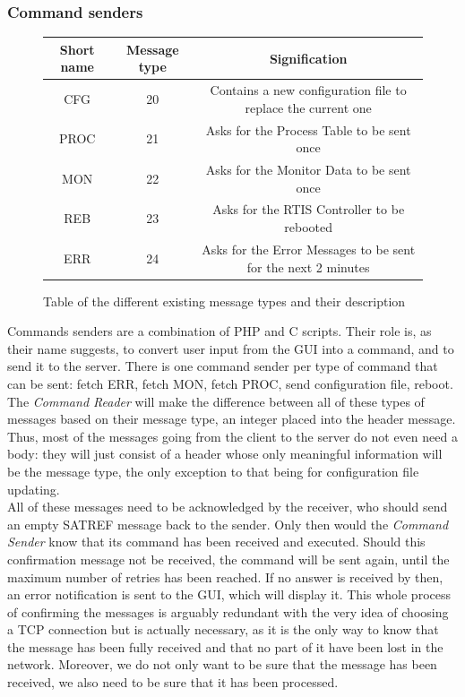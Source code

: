 \documentclass{themeensg}
\begin{document}
\subsubsection{Command senders}

\begin{figure}[hb]
	\begin{tabular}{|c|c|c|}
	  \hline
	  Short name & Message type & Signification \\
	  \hline
	  CFG & 20 & Contains a new configuration file to replace the current one \\
	  PROC & 21 & Asks for the Process Table to be sent once \\
	  MON & 22 & Asks for the Monitor Data to be sent once \\
	  REB & 23 & Asks for the RTIS Controller to be rebooted \\
	  ERR & 24 & Asks for the Error Messages to be sent for the next 2 minutes \\
	  \hline
	\end{tabular}
	\caption{Table of the different existing message types and their description}
\end{figure}

Commands senders are a combination of PHP and C scripts. Their role is, as their name suggests, to convert user input from the GUI into a command, and to send it to the server. There is one command sender per type of command that can be sent: fetch ERR, fetch MON, fetch PROC, send configuration file, reboot. The \textit{Command Reader} will make the difference between all of these types of messages based on their message type, an integer placed into the header message. Thus, most of the messages going from the client to the server do not even need a body: they will just consist of a header whose only meaningful information will be the message type, the only exception to that being for configuration file updating.\\
All of these messages need to be acknowledged by the receiver, who should send an empty SATREF message back to the sender. Only then would the \textit{Command Sender} know that its command has been received and executed. Should this confirmation message not be received, the command will be sent again, until the maximum number of retries has been reached. If no answer is received by then, an error notification is sent to the GUI, which will display it. This whole process of confirming the messages is arguably redundant with the very idea of choosing a TCP connection but is actually necessary, as it is the only way to know that the message has been fully received and that no part of it have been lost in the network. Moreover, we do not only want to be sure that the message has been received, we also need to be sure that it has been processed.
\end{document}
